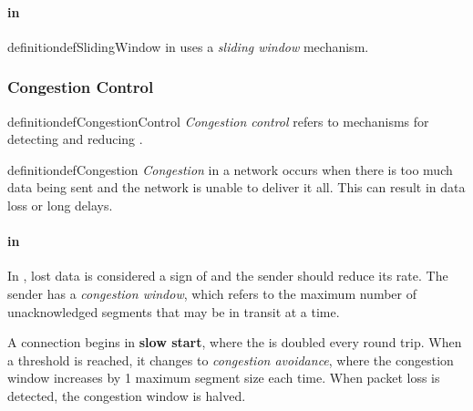 \paragraph{ in }\label{par:TCP_Flow_Control}
\begin{restatable}{definition}{defSlidingWindow}\label{def:Sliding_Window}
   in  uses a \emph{sliding window} mechanism.
\end{restatable}

\subsubsection{Congestion Control}\label{subsubsec:TCP_Congestion_Control}
\begin{restatable}{definition}{defCongestionControl}\label{def:Congestion_Control}
  \emph{Congestion control} refers to mechanisms for detecting and reducing .
\end{restatable}

\begin{restatable}[Congestion]{definition}{defCongestion}\label{def:Congestion}
    \emph{Congestion} in a network occurs when there is too much data being sent and the network is unable to deliver it all.
  This can result in data loss or long delays.
\end{restatable}

\paragraph{ in }\label{par:TCP_Congestion_Control}
\begin{definition}\label{def:Congestion_Window}
  In , lost data is considered a sign of  and the sender should reduce its rate.
  The sender has a \emph{congestion window}, which refers to the maximum number of unacknowledged segments that may be in transit at a time.
\end{definition}

A  connection begins in \textbf{slow start}, where the  is doubled every round trip.
When a threshold is reached, it changes to \emph{congestion avoidance}, where the congestion window increases by 1 maximum segment size each time.
When packet loss is detected, the congestion window is halved.

